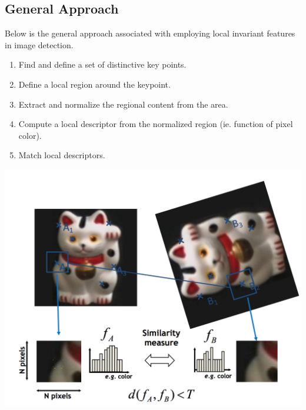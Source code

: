 \documentclass{article}
\begin{document}
\subsection{General Approach}
Below is the general approach associated with employing local invariant features in image detection.
\begin{enumerate}
\item Find and define a set of distinctive key points.
\item Define a local region around the keypoint.
\item Extract and normalize the regional content from the area.
\item Compute a local descriptor from the normalized region (ie. function of pixel color).
\item Match local descriptors.
\end{enumerate}
\begin{center}
	\includegraphics[scale=0.5]{local_feature_ex.png}\\
\end{center}
\end{document}

